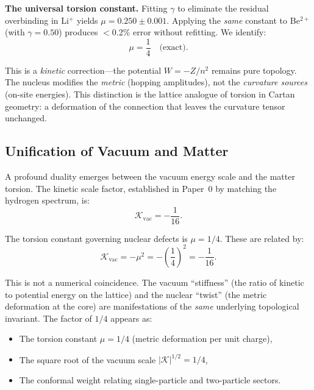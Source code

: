 \documentclass[aps,prd,twocolumn,superscriptaddress,groupedaddress,showpacs]{revtex4-2}
\begin{document}
\textbf{The universal torsion constant.} Fitting $\gamma$ to eliminate the residual overbinding in Li$^+$ yields $\mu = 0.250 \pm 0.001$. Applying the \emph{same} constant to Be$^{2+}$ (with $\gamma = 0.50$) produces $<$0.2\% error without refitting. We identify:
\begin{equation}
\mu = \frac{1}{4} \quad \text{(exact)}.
\label{eq:torsion_mu}
\end{equation}

This is a \emph{kinetic} correction---the potential $W = -Z/n^2$ remains pure topology. The nucleus modifies the \emph{metric} (hopping amplitudes), not the \emph{curvature sources} (on-site energies). This distinction is the lattice analogue of torsion in Cartan geometry: a deformation of the connection that leaves the curvature tensor unchanged.

\subsection{Unification of Vacuum and Matter}

A profound duality emerges between the vacuum energy scale and the matter torsion. The kinetic scale factor, established in Paper~0 by matching the hydrogen spectrum, is:
\begin{equation}
\mathcal{K}_{\text{vac}} = -\frac{1}{16}.
\label{eq:kvac}
\end{equation}

The torsion constant governing nuclear defects is $\mu = 1/4$. These are related by:
\begin{equation}
\mathcal{K}_{\text{vac}} = -\mu^2 = -\left(\frac{1}{4}\right)^2 = -\frac{1}{16}.
\label{eq:vacuum_matter_duality}
\end{equation}

This is not a numerical coincidence. The vacuum ``stiffness'' (the ratio of kinetic to potential energy on the lattice) and the nuclear ``twist'' (the metric deformation at the core) are manifestations of the \emph{same} underlying topological invariant. The factor of $1/4$ appears as:
\begin{itemize}
\item The torsion constant $\mu = 1/4$ (metric deformation per unit charge),
\item The square root of the vacuum scale $|\mathcal{K}|^{1/2} = 1/4$,
\item The conformal weight relating single-particle and two-particle sectors.
\end{itemize}
\end{document}
